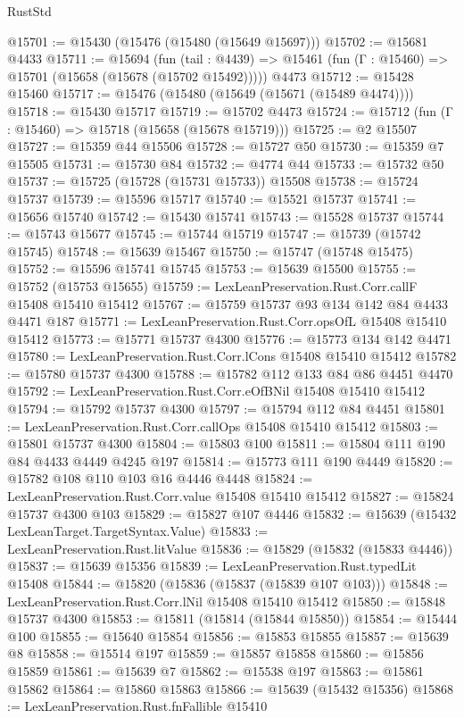\begin{lexlean}{RustStd}
\begin{coremodule}
@15701 := @15430 (@15476 (@15480 (@15649 @15697)))
@15702 := @15681 @4433
@15711 := @15694
    (fun (tail : @4439) => @15461 (fun (Γ : @15460) => @15701 (@15658 (@15678 (@15702 @15492)))))
    @4473
@15712 := @15428 @15460
@15717 := @15476 (@15480 (@15649 (@15671 (@15489 @4474))))
@15718 := @15430 @15717
@15719 := @15702 @4473
@15724 := @15712 (fun (Γ : @15460) => @15718 (@15658 (@15678 @15719)))
@15725 := @2 @15507
@15727 := @15359 @44 @15506
@15728 := @15727 @50
@15730 := @15359 @7 @15505
@15731 := @15730 @84
@15732 := @4774 @44
@15733 := @15732 @50
@15737 := @15725 (@15728 (@15731 @15733)) @15508
@15738 := @15724 @15737
@15739 := @15596 @15717
@15740 := @15521 @15737
@15741 := @15656 @15740
@15742 := @15430 @15741
@15743 := @15528 @15737
@15744 := @15743 @15677
@15745 := @15744 @15719
@15747 := @15739 (@15742 @15745)
@15748 := @15639 @15467
@15750 := @15747 (@15748 @15475)
@15752 := @15596 @15741 @15745
@15753 := @15639 @15500
@15755 := @15752 (@15753 @15655)
@15759 := LexLeanPreservation.Rust.Corr.callF @15408 @15410 @15412
@15767 := @15759 @15737 @93 @134 @142 @84 @4433 @4471 @187
@15771 := LexLeanPreservation.Rust.Corr.opsOfL @15408 @15410 @15412
@15773 := @15771 @15737 @4300
@15776 := @15773 @134 @142 @4471
@15780 := LexLeanPreservation.Rust.Corr.lCons @15408 @15410 @15412
@15782 := @15780 @15737 @4300
@15788 := @15782 @112 @133 @84 @86 @4451 @4470
@15792 := LexLeanPreservation.Rust.Corr.eOfBNil @15408 @15410 @15412
@15794 := @15792 @15737 @4300
@15797 := @15794 @112 @84 @4451
@15801 := LexLeanPreservation.Rust.Corr.callOps @15408 @15410 @15412
@15803 := @15801 @15737 @4300
@15804 := @15803 @100
@15811 := @15804 @111 @190 @84 @4433 @4449 @4245 @197
@15814 := @15773 @111 @190 @4449
@15820 := @15782 @108 @110 @103 @16 @4446 @4448
@15824 := LexLeanPreservation.Rust.Corr.value @15408 @15410 @15412
@15827 := @15824 @15737 @4300 @103
@15829 := @15827 @107 @4446
@15832 := @15639 (@15432 LexLeanTarget.TargetSyntax.Value)
@15833 := LexLeanPreservation.Rust.litValue
@15836 := @15829 (@15832 (@15833 @4446))
@15837 := @15639 @15356
@15839 := LexLeanPreservation.Rust.typedLit @15408
@15844 := @15820 (@15836 (@15837 (@15839 @107 @103)))
@15848 := LexLeanPreservation.Rust.Corr.lNil @15408 @15410 @15412
@15850 := @15848 @15737 @4300
@15853 := @15811 (@15814 (@15844 @15850))
@15854 := @15444 @100
@15855 := @15640 @15854
@15856 := @15853 @15855
@15857 := @15639 @8
@15858 := @15514 @197
@15859 := @15857 @15858
@15860 := @15856 @15859
@15861 := @15639 @7
@15862 := @15538 @197
@15863 := @15861 @15862
@15864 := @15860 @15863
@15866 := @15639 (@15432 @15356)
@15868 := LexLeanPreservation.Rust.fnFallible @15410

\end{coremodule}
\end{lexlean}
